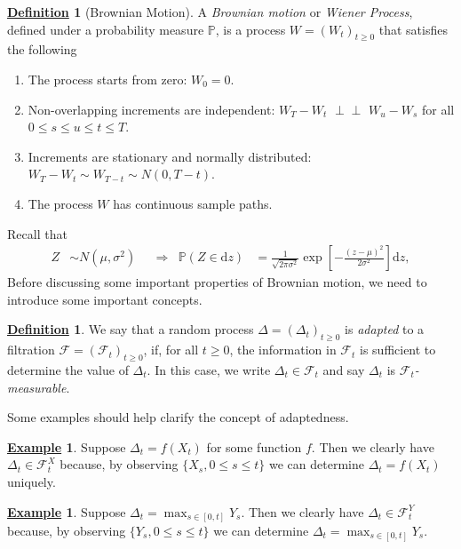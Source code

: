 \documentclass[12pt]{book}
\numberwithin{equation}{chapter}
\theoremstyle{plain}
\numberwithin{theorem}{section}
\theoremstyle{definition}
\newtheorem{definition}[theorem]{\underline{Definition}}
\newtheorem{example}[theorem]{\underline{Example}}
\numberwithin{exercise}{chapter}
\newcommand{\<}{\langle}
\renewcommand{\>}{\rangle}
\renewcommand{\(}{\left(}
\renewcommand{\)}{\right)}
\renewcommand{\[}{\left[}
\renewcommand{\]}{\right]}
\newcommand\Pb{\mathds{P}}
\newcommand\Fc{\mathscr{F}}
\newcommand\Del{\Delta}
\newcommand{\ind}{\perp \! \! \! \perp}
\newcommand\dd{\mathrm{d}}
\theoremstyle{definition}
\numberwithin{question}{section}
\begin{document}
\begin{definition}[Brownian Motion]
\label{def:bm}
A \textit{Brownian motion} or \textit{Wiener Process}, defined under a probability measure $\Pb$, is a process $W = (W_t)_{t \geq 0}$ that satisfies the following
\begin{enumerate}
\item The process starts from zero: $W_0 = 0$.
\item Non-overlapping increments are independent: $W_T - W_t$ $\ind$ $W_u - W_s$ for all $0 \leq s \leq u \leq t \leq T$. 
\item Increments are stationary and normally distributed: $W_T - W_t \sim W_{T-t} \sim N(0, T-t)$.
\item The process $W$ has continuous sample paths.
\end{enumerate}
\end{definition}

\noindent
Recall that
\begin{align}
Z 
	&\sim N(\mu, \sigma^2)&
	&\Rightarrow&
\Pb(Z \in \dd z ) 
	&= \frac{1}{\sqrt{2 \pi \sigma^2}} \exp\[-\frac{(z-\mu)^2}{2 \sigma^2}\] \dd z ,
\end{align}
Before discussing some important properties of Brownian motion, we need to introduce some important concepts.

\begin{definition}
We say that a random process $\Del = (\Del_t)_{t \geq 0}$ is \textit{adapted} to a filtration $\Fc=(\Fc_t)_{t \geq 0}$, if, for all $t \geq 0$, the information in $\Fc_t$ is sufficient to determine the value of $\Del_t$.  In this case, we write $\Del_t \in \Fc_t$ and say $\Del_t$ is \textit{$\Fc_t$-measurable}.
\end{definition}

\noindent
Some examples should help clarify the concept of adaptedness.

\begin{example}
Suppose $\Del_t = f(X_t)$ for some function $f$. Then we clearly have $\Del_t \in \Fc_t^X$ because, by observing $\{X_s, 0 \leq s \leq t\}$ we can determine $\Del_t = f(X_t)$ uniquely.
\end{example}

\begin{example}
Suppose $\Del_t = \max_{s \in [0,t]} Y_s$.  Then we clearly have $\Del_t \in \Fc_t^Y$ because, by observing $\{Y_s, 0 \leq s \leq t\}$ we can determine $\Del_t = \max_{s \in [0,t]} Y_s$.
\end{example}
\end{document}
